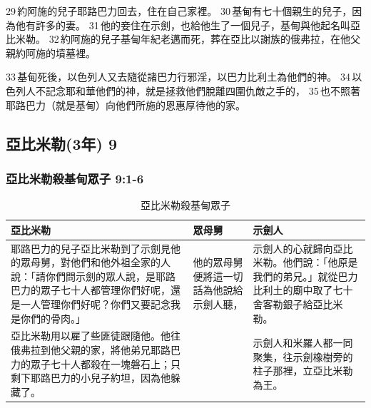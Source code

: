 29 約阿施的兒子耶路巴力回去，住在自己家裡。 30 基甸有七十個親生的兒子，因為他有許多的妻。 31 他的妾住在示劍，也給他生了一個兒子，基甸與他起名叫亞比米勒。 32 約阿施的兒子基甸年紀老邁而死，葬在亞比以謝族的俄弗拉，在他父親約阿施的墳墓裡。

33 基甸死後，以色列人又去隨從諸巴力行邪淫，以巴力比利土為他們的神。 34 以色列人不記念耶和華他們的神，就是拯救他們脫離四圍仇敵之手的， 35 也不照著耶路巴力（就是基甸）向他們所施的恩惠厚待他的家。

\subsection{亞比米勒(3年) 9}
\subsubsection{亞比米勒殺基甸眾子 9:1-6}
\begin{table}[H]
\centering
\begin{tabular}{p{8.5cm}|p{2cm}|p{6cm}}\hline\hline
亞比米勒&眾母舅&示劍人\\\hline
耶路巴力的兒子亞比米勒到了示劍見他的眾母舅，對他們和他外祖全家的人說：「請你們問示劍的眾人說，是耶路巴力的眾子七十人都管理你們好呢，還是一人管理你們好呢？你們又要記念我是你們的骨肉。」 
&他的眾母舅便將這一切話為他說給示劍人聽，&示劍人的心就歸向亞比米勒。他們說：「他原是我們的弟兄。」就從巴力比利土的廟中取了七十舍客勒銀子給亞比米勒。\\\hline
亞比米勒用以雇了些匪徒跟隨他。他往俄弗拉到他父親的家，將他弟兄耶路巴力的眾子七十人都殺在一塊磐石上；只剩下耶路巴力的小兒子約坦，因為他躲藏了。&&示劍人和米羅人都一同聚集，往示劍橡樹旁的柱子那裡，立亞比米勒為王。\\\hline
 \end{tabular}
\caption{亞比米勒殺基甸眾子}
\end{table}

